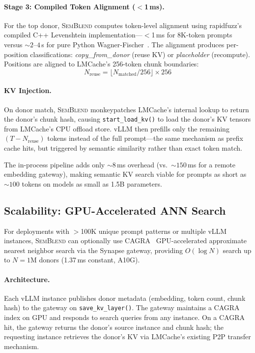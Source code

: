\documentclass[10pt,twocolumn]{article}
\newcommand{\semblend}{\textsc{SemBlend}\xspace}
\begin{document}
\paragraph{Stage 3: Compiled Token Alignment ($<$1\,ms).}
For the top donor, \semblend computes token-level alignment using
rapidfuzz's~\cite{rapidfuzz} compiled C++ Levenshtein
implementation---$<$1\,ms for 8K-token prompts versus
${\sim}2\text{--}4$\,s for pure Python Wagner-Fischer~\cite{wagnerfischer}.
The alignment produces per-position classifications:
\emph{copy\_from\_donor} (reuse KV) or \emph{placeholder} (recompute).
Positions are aligned to LMCache's 256-token chunk boundaries:
\begin{equation}
  N_\text{reuse} = \lfloor N_\text{matched} / 256 \rfloor \times 256
  \label{eq:chunk-align}
\end{equation}

\paragraph{KV Injection.}
On donor match, \semblend monkeypatches LMCache's internal lookup to
return the donor's chunk hash, causing \texttt{start\_load\_kv()} to
load the donor's KV tensors from LMCache's CPU offload store. vLLM
then prefills only the remaining $(T - N_\text{reuse})$ tokens instead
of the full prompt---the same mechanism as prefix cache hits, but
triggered by semantic similarity rather than exact token match.

The in-process pipeline adds only ${\sim}8$\,ms overhead (vs.\ ${\sim}150$\,ms
for a remote embedding gateway), making semantic KV search viable for
prompts as short as ${\sim}100$ tokens on models as small as 1.5B parameters.

\subsection{Scalability: GPU-Accelerated ANN Search}
\label{sec:scaled}

For deployments with $>$100K unique prompt patterns or multiple vLLM
instances, \semblend can optionally use CAGRA~\cite{cagra}
GPU-accelerated approximate nearest neighbor search via the Synapse
gateway, providing $O(\log N)$ search up to $N{=}1\text{M}$ donors
(1.37\,ms constant, A10G).

\paragraph{Architecture.}
Each vLLM instance publishes donor metadata (embedding, token count,
chunk hash) to the gateway on \texttt{save\_kv\_layer()}. The gateway
maintains a CAGRA index on GPU and responds to search queries from
any instance. On a CAGRA hit, the gateway returns the donor's source
instance and chunk hash; the requesting instance retrieves the donor's
KV via LMCache's existing P2P transfer mechanism.
\end{document}
